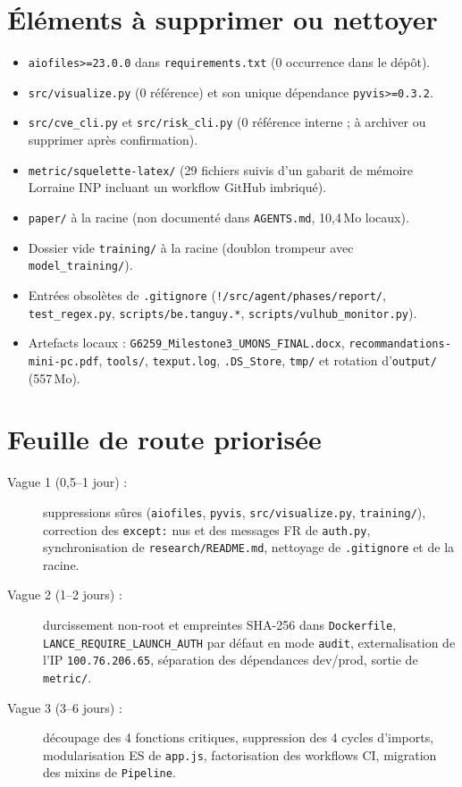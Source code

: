 \documentclass[11pt,a4paper]{article}
\begin{document}
\section{Éléments à supprimer ou nettoyer}
\begin{itemize}
  \item \texttt{aiofiles>=23.0.0} dans \texttt{requirements.txt} (0 occurrence dans le dépôt).
  \item \texttt{src/visualize.py} (0 référence) et son unique dépendance \texttt{pyvis>=0.3.2}.
  \item \texttt{src/cve\_cli.py} et \texttt{src/risk\_cli.py} (0 référence interne ; à archiver ou supprimer après confirmation).
  \item \texttt{metric/squelette-latex/} (29 fichiers suivis d'un gabarit de mémoire Lorraine INP incluant un workflow GitHub imbriqué).
  \item \texttt{paper/} à la racine (non documenté dans \texttt{AGENTS.md}, 10,4\,Mo locaux).
  \item Dossier vide \texttt{training/} à la racine (doublon trompeur avec \texttt{model\_training/}).
  \item Entrées obsolètes de \texttt{.gitignore} (\texttt{!/src/agent/phases/report/}, \texttt{test\_regex.py}, \texttt{scripts/be.tanguy.*}, \texttt{scripts/vulhub\_monitor.py}).
  \item Artefacts locaux : \texttt{G6259\_Milestone3\_UMONS\_FINAL.docx}, \texttt{recommandations-mini-pc.pdf}, \texttt{tools/}, \texttt{texput.log}, \texttt{.DS\_Store}, \texttt{tmp/} et rotation d'\texttt{output/} (557\,Mo).
\end{itemize}

\section{Feuille de route priorisée}
\begin{description}
  \item[Vague 1 (0,5--1 jour) :] suppressions sûres (\texttt{aiofiles}, \texttt{pyvis}, \texttt{src/visualize.py}, \texttt{training/}), correction des \texttt{except:} nus et des messages FR de \texttt{auth.py}, synchronisation de \texttt{research/README.md}, nettoyage de \texttt{.gitignore} et de la racine.
  \item[Vague 2 (1--2 jours) :] durcissement non-root et empreintes SHA-256 dans \texttt{Dockerfile}, \texttt{LANCE\_REQUIRE\_LAUNCH\_AUTH} par défaut en mode \texttt{audit}, externalisation de l'IP \texttt{100.76.206.65}, séparation des dépendances dev/prod, sortie de \texttt{metric/}.
  \item[Vague 3 (3--6 jours) :] découpage des 4 fonctions critiques, suppression des 4 cycles d'imports, modularisation ES de \texttt{app.js}, factorisation des workflows CI, migration des mixins de \texttt{Pipeline}.
\end{description}
\end{document}
